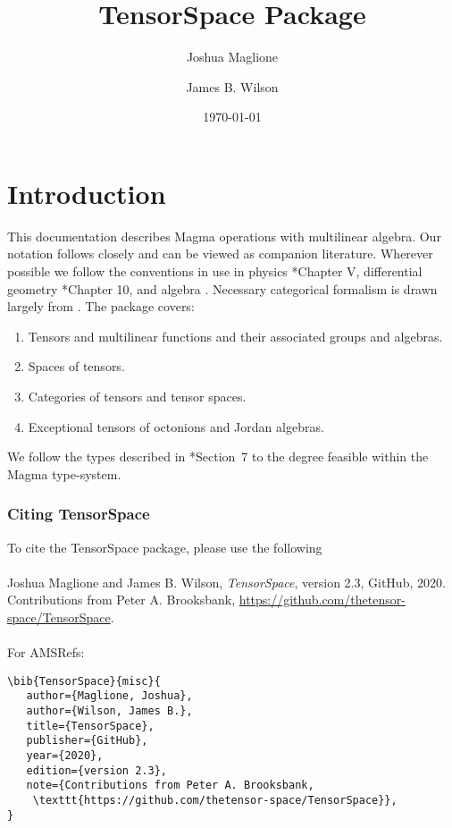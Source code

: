 \documentclass{documentation}
\title{TensorSpace Package}
\author{Joshua Maglione}
\author{James B. Wilson}
\date{\today}
\begin{document}
\frontmatter

\dominitoc
\maketitle
\tableofcontents

\mainmatter

\chapter{Introduction}

This documentation describes Magma operations with multilinear algebra. Our
notation follows \cite{FMW:densors} closely and can be viewed as companion
literature. Wherever possible we follow the conventions in use in physics
\cite{Weyl}*{Chapter V}, differential geometry \cite{Lee:geom}*{Chapter 10}, and
algebra \cite{Landsberg:tensors}. Necessary categorical formalism is drawn
largely from \cite{Wilson:division}. The package covers:
\begin{enumerate}
\item Tensors and multilinear functions and their associated groups and algebras.
\item Spaces of tensors.
\item Categories of tensors and tensor spaces.
\item Exceptional tensors of octonions and Jordan algebras.
\end{enumerate}
We follow the types described in \cite{FMW:densors}*{Section~7} to the degree
feasible within the Magma type-system.
\bigskip

\subsection*{Citing TensorSpace} 
To cite the TensorSpace package, please use the following\\
\\
Joshua Maglione and James B. Wilson, \emph{TensorSpace}, version 2.3, GitHub,
2020. Contributions from Peter A. Brooksbank,
\url{https://github.com/thetensor-space/TensorSpace}. \\
\\
For AMSRefs:
\begin{verbatim}
\bib{TensorSpace}{misc}{
   author={Maglione, Joshua},
   author={Wilson, James B.},
   title={TensorSpace},
   publisher={GitHub},
   year={2020},
   edition={version 2.3},
   note={Contributions from Peter A. Brooksbank, 
    \texttt{https://github.com/thetensor-space/TensorSpace}},
}
\end{verbatim}
\end{document}
